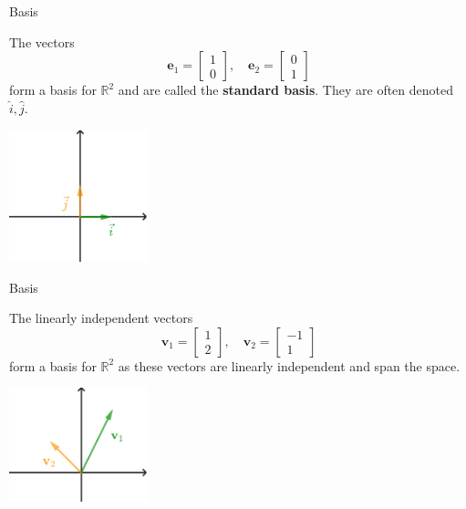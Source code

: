 \documentclass{beamer}
\newcommand{\vv}{\mathbf{v}}
\begin{document}
\begin{frame}{Basis}
  \begin{example}
    The vectors
    $$\mathbf{e}_1 = \begin{bmatrix} 1 \\ 0 \end{bmatrix}, \quad \mathbf{e}_2 = \begin{bmatrix} 0 \\ 1 \end{bmatrix}
    $$
    form a basis for $\mathbb{R}^2$ and are called the \textbf{standard basis}. They are often denoted $\hat{i}, \hat{j}$.
  \end{example}
  
      \begin{center}
    \includegraphics[width=0.3\textwidth, keepaspectratio]{ij basis.png}
  \end{center}
    
\end{frame}

\begin{frame}{Basis}
  \begin{example}
   The linearly independent vectors
    \[
    \vv_1 = \begin{bmatrix} 1 \\ 2 \end{bmatrix}, \quad \vv_2 = \begin{bmatrix} -1 \\ 1 \end{bmatrix}
    \]
    form a basis for $\mathbb{R}^2$
    as these vectors are linearly independent and span the space.
  \end{example}
  
      \begin{center}
    \includegraphics[width=0.3\textwidth,  keepaspectratio]{v1v2 basis.png}
  \end{center}
  
    
\end{frame}
\end{document}
